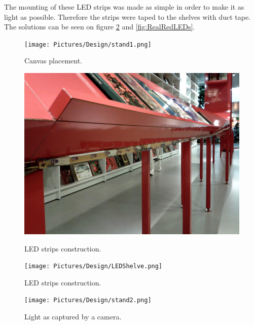 The mounting of these LED strips was made as simple in order to make it as light as possible. Therefore the strips were taped to the shelves with duct tape. The solutions can be seen on figure \ref{fig:RealLEDs} and \ref{fig:RealRedLEDs}.

\begin{figure}[htbp] 
\centering 
\texttt{[image: Pictures/Design/stand1.png]} 
\caption{Canvas placement.}
\label{fig:LEDsPosition} 
\end{figure}

\begin{figure}[htbp] \centering
\begin{minipage}[b]{0.45\textwidth} \centering
\includegraphics[width=1.00\textwidth]{Pictures/Design/LEDRedShelve.png}
\caption{LED strips construction.}
\label{fig:RealRedLEDs}
\end{minipage} \hfill
\begin{minipage}[b]{0.45\textwidth} \centering
\texttt{[image: Pictures/Design/LEDShelve.png]} 
\caption{LED strips construction.}
\label{fig:RealLEDs}
\end{minipage} \hfill
\end{figure}

\begin{figure}[htbp] 
\centering 
\texttt{[image: Pictures/Design/stand2.png]} 
\caption{Light as captured by a camera.} 
\label{fig:CanvasPosition} 
\end{figure}